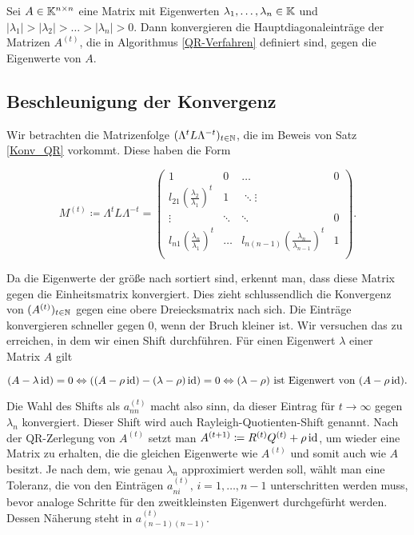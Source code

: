 \documentclass{article}
\begin{document}
\begin{theorem}
	\label{Konv_QR}
	Sei $A \in \mathbb{K}^{n\times n}$ eine Matrix mit Eigenwerten $\lambda_1,\dots,\lambda_n \in \mathbb{K}$ und $|\lambda_1| > |\lambda_2| > \dots > |\lambda_n| > 0$. Dann konvergieren die Hauptdiagonaleinträge der Matrizen $A^{(t)}$, die in Algorithmus \ref{QR-Verfahren} definiert sind, gegen die Eigenwerte von $A$.
\end{theorem}


\subsection{Beschleunigung der Konvergenz}

Wir betrachten die Matrizenfolge $(\Lambda^t L \Lambda^{-t})_{t \in \mathbb{N}}$, die im Beweis von Satz \ref{Konv_QR} vorkommt. Diese haben die Form

\begin{equation*}
	M^{(t)} \coloneqq \Lambda^t L \Lambda^{-t} =
	\left( \begin{array}{rrrr}
		1 & 0 & \dots & 0 \\
		l_{21} \left(\frac{\lambda_2}{\lambda_1}\right)^t & 1 & \ddots \vdots \\
		\vdots & \ddots & \ddots & 0 \\
		l_{n1} \left(\frac{\lambda_n}{\lambda_1}\right)^t & \dots & l_{n(n-1)} \left(\frac{\lambda_n}{\lambda_{n-1}}\right)^t & 1 \\
	\end{array}\right).
\end{equation*}

Da die Eigenwerte der größe nach sortiert sind, erkennt man, dass diese Matrix gegen die Einheitsmatrix konvergiert. Dies zieht schlussendlich die Konvergenz von $(A^{(t)})_{t\in \mathbb{N}}$ gegen eine obere Dreiecksmatrix nach sich.
Die Einträge konvergieren schneller gegen $0$, wenn der Bruch kleiner ist. Wir versuchen das zu erreichen, in dem wir einen Shift durchführen. Für einen Eigenwert $\lambda$ einer Matrix $A$ gilt

\begin{equation*}
	(A - \lambda \operatorname{id}) = 0 \Leftrightarrow ((A - \rho \operatorname{id}) - (\lambda -\rho) \operatorname{id}) = 0 \Leftrightarrow (\lambda-\rho) \text{ ist Eigenwert von }  (A - \rho \operatorname{id}).
\end{equation*}

Die Wahl des Shifts als $a^{(t)}_{nn}$ macht also sinn, da dieser Eintrag für $t \rightarrow \infty$ gegen $\lambda_n$ konvergiert. Dieser Shift wird auch Rayleigh-Quotienten-Shift genannt. Nach der QR-Zerlegung von $A^{(t)}$ setzt man $A^{(t+1)} \coloneqq R^{(t)}Q^{(t)} + \rho \operatorname{id}$, um wieder eine Matrix zu erhalten, die die gleichen Eigenwerte wie $A^{(t)}$ und somit auch wie $A$ besitzt.
Je nach dem, wie genau $\lambda_n$ approximiert werden soll, wählt man eine Toleranz, die von den Einträgen $a^{(t)}_{ni}, \, i = 1,\dots, n-1$ unterschritten werden muss, bevor analoge Schritte für den zweitkleinsten Eigenwert durchgefürht werden. Dessen Näherung steht in $a^{(t)}_{(n-1)(n-1)}$.
\end{document}
